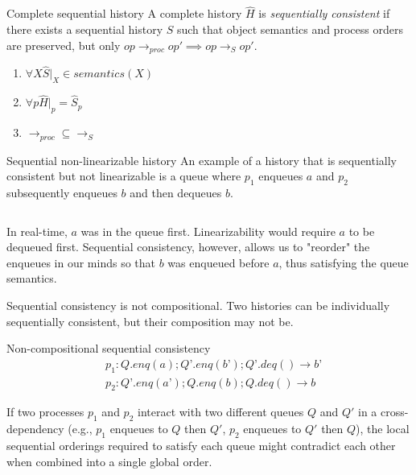 \begin{Definition}{Complete sequential history}{}
    A complete history $\widehat{H}$ is \textit{sequentially consistent} if there exists a sequential history $\widehat{S}$ such that object semantics and process orders are preserved, but only $op\longrightarrow_{proc} op' \implies op\longrightarrow_S op'$.

    \begin{enumerate}
        \item $\forall X \widehat{S}|_X \in semantics(X)$
        \item $\forall p \widehat{H}|_p = \widehat{S}_p$
        \item $\longrightarrow_{proc} \subseteq \longrightarrow_S$
    \end{enumerate}
\end{Definition}

\begin{Example}{Sequential non-linearizable history}{}
    An example of a history that is sequentially consistent but not linearizable is a queue where $p_1$ enqueues $a$ and $p_2$ subsequently enqueues $b$ and then dequeues $b$. 

    \begin{equation*}
        [Q.enq(a)()\textit{ by }p_1][Q.enq(b)()\textit{ by }p_2][Q.deq()(b)\textit{ to }p_2]
    \end{equation*}
    
    In real-time, $a$ was in the queue first. Linearizability would require $a$ to be dequeued first. Sequential consistency, however, allows us to "reorder" the enqueues in our minds so that $b$ was enqueued before $a$, thus satisfying the queue semantics.
\end{Example}

Sequential consistency is not compositional. Two histories can be individually sequentially consistent, but their composition may not be. 

\begin{Example}{Non-compositional sequential consistency}{}
\begin{align*}
    &p_1: Q.enq(a); Q’.enq(b’); Q’.deq()\rightarrow b’\\
    &p_2: Q’.enq(a’); Q.enq(b); Q.deq()\rightarrow b
\end{align*}

If two processes $p_1$ and $p_2$ interact with two different queues $Q$ and $Q'$ in a cross-dependency (e.g., $p_1$ enqueues to $Q$ then $Q'$, $p_2$ enqueues to $Q'$ then $Q$), the local sequential orderings required to satisfy each queue might contradict each other when combined into a single global order.    
\end{Example}

